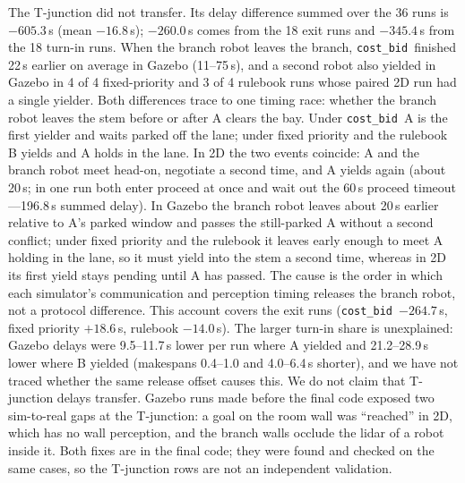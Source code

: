 \documentclass[letterpaper,journal]{IEEEtran}
\newcommand{\cb}{\texttt{cost\_bid}}
\begin{document}
The T-junction did not transfer. Its delay difference summed over the 36 runs is $-605.3$\,s (mean $-16.8$\,s); $-260.0$\,s comes from the 18 exit runs and $-345.4$\,s from the 18 turn-in runs. When the branch robot leaves the branch, \cb\ finished 22\,s earlier on average in Gazebo (11--75\,s), and a second robot also yielded in Gazebo in 4 of 4 fixed-priority and 3 of 4 rulebook runs whose paired 2D run had a single yielder. Both differences trace to one timing race: whether the branch robot leaves the stem before or after A clears the bay. Under \cb\ A is the first yielder and waits parked off the lane; under fixed priority and the rulebook B yields and A holds in the lane. In 2D the two events coincide: A and the branch robot meet head-on, negotiate a second time, and A yields again (about 20\,s; in one run both enter proceed at once and wait out the 60\,s proceed timeout---196.8\,s summed delay). In Gazebo the branch robot leaves about 20\,s earlier relative to A's parked window and passes the still-parked A without a second conflict; under fixed priority and the rulebook it leaves early enough to meet A holding in the lane, so it must yield into the stem a second time, whereas in 2D its first yield stays pending until A has passed. The cause is the order in which each simulator's communication and perception timing releases the branch robot, not a protocol difference. This account covers the exit runs (\cb\ $-264.7$\,s, fixed priority $+18.6$\,s, rulebook $-14.0$\,s). The larger turn-in share is unexplained: Gazebo delays were 9.5--11.7\,s lower per run where A yielded and 21.2--28.9\,s lower where B yielded (makespans 0.4--1.0 and 4.0--6.4\,s shorter), and we have not traced whether the same release offset causes this. We do not claim that T-junction delays transfer. Gazebo runs made before the final code exposed two sim-to-real gaps at the T-junction: a goal on the room wall was ``reached'' in 2D, which has no wall perception, and the branch walls occlude the lidar of a robot inside it. Both fixes are in the final code; they were found and checked on the same cases, so the T-junction rows are not an independent validation. %
\end{document}
